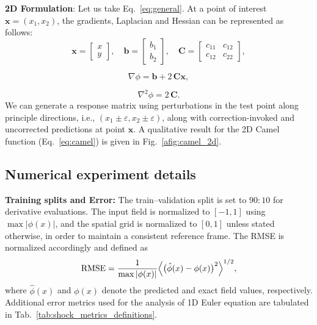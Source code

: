 \documentclass{article} %
\theoremstyle{plain}
\begin{document}
\textbf{2D Formulation}: Let us take Eq.~\ref{eq:general}. At a point of interest $\pmb{x} = (x_1, x_2)$, the gradients, Laplacian and Hessian can be represented as follows:
\begin{equation}
\mathbf{x} =
\begin{bmatrix}
x \\
y
\end{bmatrix},\quad
\mathbf{b} =
\begin{bmatrix}
b_1 \\
b_2
\end{bmatrix},\quad
\mathbf{C} =
\begin{bmatrix}
c_{11} & c_{12} \\
c_{12} & c_{22}
\end{bmatrix},
\end{equation}

\begin{equation}
\nabla \phi = \pmb{b} + 2 \, \pmb{C}\pmb{x},
\end{equation}

\begin{equation}
\nabla^2 \phi = 2\,\pmb{C}.
\end{equation}
We can generate a response matrix using perturbations in the test point along principle directions, i.e., $(x_1\pm\varepsilon, x_2\pm \varepsilon)$, along with correction-invoked and uncorrected predictions at point $\pmb{x}$. A qualitative result for the 2D Camel function (Eq.~\ref{eq:camel}) is given in Fig.~\ref{afig:camel_2d}. 




\subsection{Numerical experiment details}\label{asec:num_exp}

\textbf{Training splits and Error:} The train--validation split is set to $90{:}10$ for derivative evaluations. 
The input field is normalized to $[-1,1]$ using $\max|\phi(x)|$, and the spatial grid is normalized to $[0,1]$ unless stated otherwise, in order to maintain a consistent reference frame. 
The RMSE is normalized accordingly and defined as
\begin{equation}
\mathrm{RMSE}
=
\frac{1}{\max|\phi(x)|}
\Bigl\langle\bigl(\hat{\phi}(x)-\phi(x)\bigr)^2\Bigr\rangle^{1/2},
\end{equation}
where $\hat{\phi}(x)$ and $\phi(x)$ denote the predicted and exact field values, respectively.
Additional error metrics used for the analysis of 1D Euler equation are tabulated in Tab.~\ref{tab:shock_metrics_definitions}.
\end{document}
